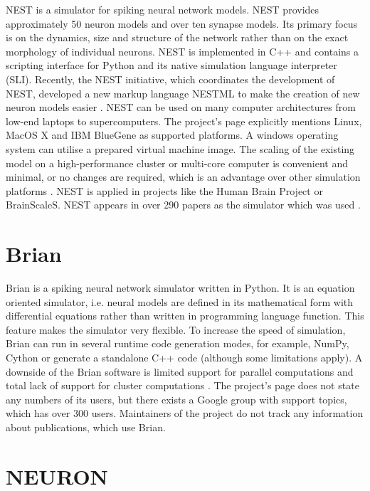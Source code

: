 NEST is a simulator for spiking neural network models. NEST provides approximately 50 neuron models and over ten synapse models. Its primary focus is on the dynamics, size and structure of the network rather than on the exact morphology of individual neurons. NEST is implemented in C++ and contains a scripting interface for Python and its native simulation language interpreter (SLI). Recently, the NEST initiative, which coordinates the development of NEST, developed a new markup language NESTML to make the creation of new neuron models easier \cite{plotnikovNESTMLModelingLanguage2016}.  NEST can be used on many computer architectures from low-end laptops to supercomputers. The project's page explicitly mentions Linux, MacOS X and IBM BlueGene as supported platforms. A windows operating system can utilise a prepared virtual machine image. The scaling of the existing model on a high-performance cluster or multi-core computer is convenient and minimal, or no changes are required, which is an advantage over other simulation platforms \cite{tikidji-hamburyanSoftwareBrainNetwork2017}. NEST is applied in projects like the Human Brain Project or BrainScaleS. NEST appears in over 290 papers as the simulator which was used \cite{julichaachenresearchallianceNESTNeuralSimulation2015}.

\section{Brian}

Brian is a spiking neural network simulator written in Python. It is an equation oriented simulator, i.e. neural models are defined in its mathematical form with differential equations rather than written in programming language function. This feature makes the simulator very flexible. To increase the speed of simulation, Brian can run in several runtime code generation modes, for example, NumPy, Cython or generate a standalone C++ code (although some limitations apply). A downside of the Brian software is limited support for parallel computations and total lack of support for cluster computations \cite{tikidji-hamburyanSoftwareBrainNetwork2017}. The project's page does not state any numbers of its users, but there exists a Google group \cite{Brian} with support topics, which has over 300 users. Maintainers of the project do not track any information about publications, which use Brian.

\section{NEURON}


